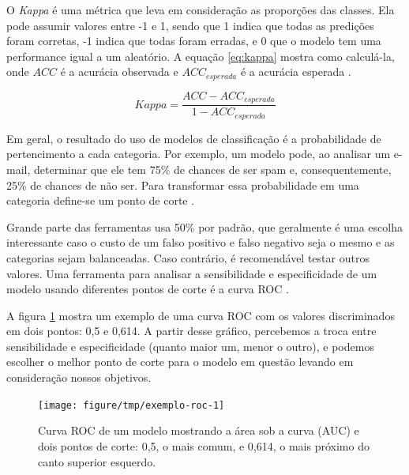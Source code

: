 \documentclass[a4paper,titlepage]{ppgi}\usepackage[]{graphicx}\usepackage[]{color}
\newenvironment{knitrout}{}{} %
\begin{document}
O \emph{Kappa} é uma métrica que leva em consideração as proporções das
classes. Ela pode assumir valores entre -1 e 1, sendo que 1 indica que todas as
predições foram corretas, -1 indica que todas foram erradas, e 0 que o modelo
tem uma performance igual a um aleatório. A equação \ref{eq:kappa} mostra como
calculá-la, onde $ACC$ é a acurácia observada e $ACC_{esperada}$ é a acurácia
esperada \cite{Cohen1960}.

\begin{equation}
\label{eq:kappa}
Kappa = \frac{ACC - ACC_{esperada}}{1 - ACC_{esperada}}
\end{equation}

Em geral, o resultado do uso de modelos de classificação é a probabilidade de
pertencimento a cada categoria. Por exemplo, um modelo pode, ao analisar um
e-mail, determinar que ele tem 75\% de chances de ser spam e, consequentemente,
25\% de chances de não ser. Para transformar essa probabilidade em uma
categoria define-se um ponto de corte \cite{Kuhn2013}.

Grande parte das ferramentas usa 50\% por padrão, que geralmente é uma escolha
interessante caso o custo de um falso positivo e falso negativo seja o mesmo e
as categorias sejam balanceadas. Caso contrário, é recomendável testar outros
valores. Uma ferramenta para analisar a sensibilidade e especificidade de um
modelo usando diferentes pontos de corte é a curva \gls{ROC}
\cite{Altman1994,Brown2006,Fawcett2006}.

A figura \ref{fig:exemplo-roc} mostra um exemplo de uma curva \gls{ROC} com os
valores discriminados em dois pontos: 0,5 e 0,614. A partir desse gráfico,
percebemos a troca entre sensibilidade e especificidade (quanto maior um, menor
o outro), e podemos escolher o melhor ponto de corte para o modelo em questão
levando em consideração nossos objetivos.

\begin{knitrout}
\color{fgcolor}\begin{figure}
\texttt{[image: figure/tmp/exemplo-roc-1]} \caption[Curva ROC de um modelo mostrando a área sob a curva (AUC) e dois pontos de corte]{Curva ROC de um modelo mostrando a área sob a curva (AUC) e dois pontos de corte: 0,5, o mais comum, e 0,614, o mais próximo do canto superior esquerdo.}\label{fig:exemplo-roc}
\end{figure}


\end{knitrout}
\end{document}
